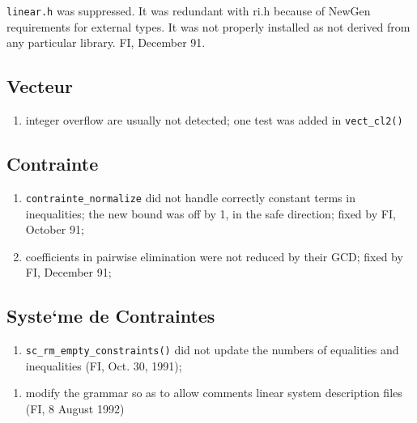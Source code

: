 \verb+linear.h+ was suppressed. It was redundant with ri.h because
of NewGen requirements for external types. It was not properly
installed as not derived from any particular library. FI, December 91.

\subsection{Vecteur}

\begin{enumerate}

  \item integer overflow are usually not detected; one test was
	added in \verb+vect_cl2()+

\end{enumerate}

\subsection{Contrainte}

\begin{enumerate}

  \item \verb+contrainte_normalize+ did not handle correctly constant terms
in inequalities; the new bound was off by 1, in the safe direction; fixed
by FI, October 91;

  \item coefficients in pairwise elimination were not reduced by their
	GCD; fixed by FI, December 91;

\end{enumerate}

\subsection{Syste`me de Contraintes}

\begin{enumerate}

  \item \verb+sc_rm_empty_constraints()+ did not update the numbers of
	equalities and inequalities (FI, Oct. 30, 1991);

\end{enumerate}

\begin{enumerate}

  \item modify the grammar so as to allow comments linear system
	description files (FI, 8 August 1992)

\end{enumerate}

